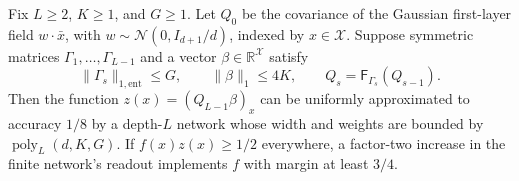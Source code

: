 \begin{proposition}\label{prop:tilt-compress}
Fix $L\geq2$, $K\geq1$, and $G\geq1$. Let $Q_0$ be the covariance of the
Gaussian first-layer field $w\cdot\bar x$, with
$w\sim\mathcal N(0,I_{d+1}/d)$, indexed by $x\in\mathcal X$.
Suppose symmetric matrices $\Gamma_1,\ldots,\Gamma_{L-1}$ and a vector
$\beta\in\mathbb R^{\mathcal X}$ satisfy
\[
 \|\Gamma_s\|_{1,\mathrm{ent}}\leq G,\qquad
 \|\beta\|_1\leq4K,
 \qquad Q_s=\mathsf F_{\Gamma_s}(Q_{s-1}).
\]
Then the function $z(x)=(Q_{L-1}\beta)_x$ can be uniformly approximated to
accuracy $1/8$ by a depth-$L$ network whose width and weights are bounded by
$\operatorname{poly}_L(d,K,G)$.
If $f(x)z(x)\geq1/2$ everywhere, a factor-two increase in the finite
network's readout implements $f$ with margin at least $3/4$.
\end{proposition}
